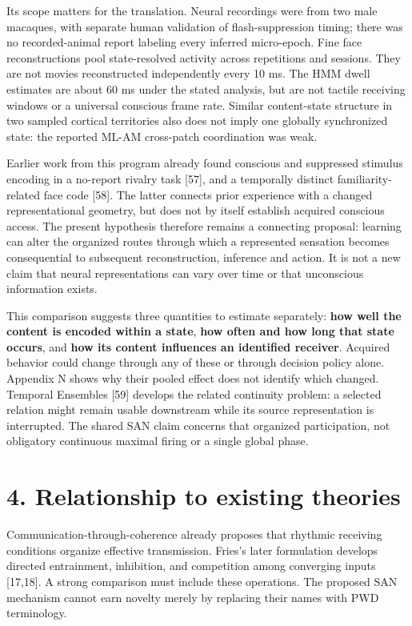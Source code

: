 \documentclass[
  american,
  11pt,
  letterpaper,
]{article}
\begin{document}
Its scope matters for the translation. Neural recordings were from two male macaques, with separate human validation of flash-suppression timing; there was no recorded-animal report labeling every inferred micro-epoch. Fine face reconstructions pool state-resolved activity across repetitions and sessions. They are not movies reconstructed independently every 10 ms. The HMM dwell estimates are about 60 ms under the stated analysis, but are not tactile receiving windows or a universal conscious frame rate. Similar content-state structure in two sampled cortical territories also does not imply one globally synchronized state: the reported ML-AM cross-patch coordination was weak.

Earlier work from this program already found conscious and suppressed stimulus encoding in a no-report rivalry task {[}57{]}, and a temporally distinct familiarity-related face code {[}58{]}. The latter connects prior experience with a changed representational geometry, but does not by itself establish acquired conscious access. The present hypothesis therefore remains a connecting proposal: learning can alter the organized routes through which a represented sensation becomes consequential to subsequent reconstruction, inference and action. It is not a new claim that neural representations can vary over time or that unconscious information exists.

This comparison suggests three quantities to estimate separately: \textbf{how well the content is encoded within a state}, \textbf{how often and how long that state occurs}, and \textbf{how its content influences an identified receiver}. Acquired behavior could change through any of these or through decision policy alone. Appendix N shows why their pooled effect does not identify which changed. Temporal Ensembles {[}59{]} develops the related continuity problem: a selected relation might remain usable downstream while its source representation is interrupted. The shared SAN claim concerns that organized participation, not obligatory continuous maximal firing or a single global phase.

\section{4. Relationship to existing theories}\label{relationship-to-existing-theories}

Communication-through-coherence already proposes that rhythmic receiving conditions organize effective transmission. Fries's later formulation develops directed entrainment, inhibition, and competition among converging inputs {[}17,18{]}. A strong comparison must include these operations. The proposed SAN mechanism cannot earn novelty merely by replacing their names with PWD terminology.
\end{document}
